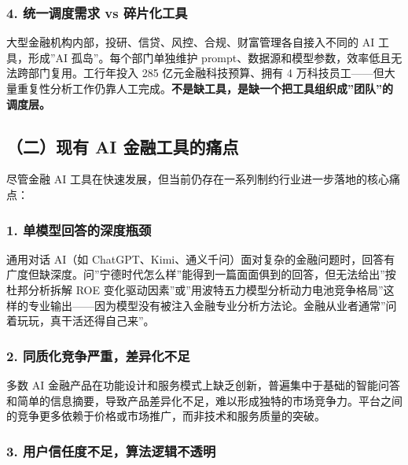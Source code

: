 \documentclass[
]{ctexart}
\begin{document}
\subsubsection{4. 统一调度需求 vs
碎片化工具}\label{ux7edfux4e00ux8c03ux5ea6ux9700ux6c42-vs-ux788eux7247ux5316ux5de5ux5177}

大型金融机构内部，投研、信贷、风控、合规、财富管理各自接入不同的 AI
工具，形成''AI 孤岛''。每个部门单独维护
prompt、数据源和模型参数，效率低且无法跨部门复用。工行年投入 285
亿元金融科技预算、拥有 4
万科技员工------但大量重复性分析工作仍靠人工完成。\textbf{不是缺工具，是缺一个把工具组织成''团队''的调度层。}

\subsection{（二）现有 AI
金融工具的痛点}\label{ux4e8cux73b0ux6709-ai-ux91d1ux878dux5de5ux5177ux7684ux75dbux70b9}

尽管金融 AI
工具在快速发展，但当前仍存在一系列制约行业进一步落地的核心痛点：

\subsubsection{1.
单模型回答的深度瓶颈}\label{ux5355ux6a21ux578bux56deux7b54ux7684ux6df1ux5ea6ux74f6ux9888}

通用对话 AI（如
ChatGPT、Kimi、通义千问）面对复杂的金融问题时，回答有广度但缺深度。问''宁德时代怎么样''能得到一篇面面俱到的回答，但无法给出''按杜邦分析拆解
ROE
变化驱动因素''或''用波特五力模型分析动力电池竞争格局''这样的专业输出------因为模型没有被注入金融专业分析方法论。金融从业者通常''问着玩玩，真干活还得自己来''。

\subsubsection{2.
同质化竞争严重，差异化不足}\label{ux540cux8d28ux5316ux7adeux4e89ux4e25ux91cdux5deeux5f02ux5316ux4e0dux8db3}

多数 AI
金融产品在功能设计和服务模式上缺乏创新，普遍集中于基础的智能问答和简单的信息摘要，导致产品差异化不足，难以形成独特的市场竞争力。平台之间的竞争更多依赖于价格或市场推广，而非技术和服务质量的突破。

\subsubsection{3.
用户信任度不足，算法逻辑不透明}\label{ux7528ux6237ux4fe1ux4efbux5ea6ux4e0dux8db3ux7b97ux6cd5ux903bux8f91ux4e0dux900fux660e}
\end{document}
